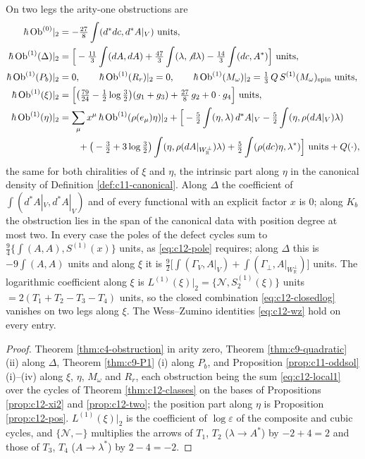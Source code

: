 \begin{theorem}
\label{thm:c12-ob1}
On two legs the arity-one obstructions are
\begin{equation}
\begin{aligned}
\hbar\,\mathrm{Ob}^{(0)}|_2&=-\tfrac{27}8\int(d^*dc,d^*A|_V)\ \text{units},\\
\hbar\,\mathrm{Ob}^{(1)}(\Delta)|_2&=\Big[-\tfrac{11}3\int(dA,dA)+\tfrac{47}3\int(\lambda,{\not d}\lambda)-\tfrac{14}3\int(dc,A^*)\Big]\ \text{units},\\
\hbar\,\mathrm{Ob}^{(1)}(P_b)|_2&=0,\qquad \hbar\,\mathrm{Ob}^{(1)}(R_r)|_2=0,\qquad \hbar\,\mathrm{Ob}^{(1)}(M_\omega)|_2=\tfrac13\,Q\,S^{(1)}(M_\omega)_{\rm spin}\ \text{units},\\
\hbar\,\mathrm{Ob}^{(1)}(\xi)|_2&=\Big[\big(\tfrac{79}{24}-\tfrac12\log\tfrac32\big)(g_1+g_3)+\tfrac{27}8\,g_2+0\cdot g_4\Big]\ \text{units},\\
\hbar\,\mathrm{Ob}^{(1)}(\eta)|_2&=\sum_\mu x^\mu\,\hbar\,\mathrm{Ob}^{(1)}(\rho(e_\mu)\eta)|_2+\Big[-\tfrac52\int(\eta,\lambda)\,d^*A|_V-\tfrac52\int(\eta,\rho(dA|_V)\lambda)\\
&\qquad+\big(-\tfrac32+3\log\tfrac32\big)\int(\eta,\rho(dA|_{W_{\mathbb R}^\perp})\lambda)+\tfrac52\int(\rho(dc)\eta,\lambda^*)\Big]\ \text{units}+Q(\cdot),
\end{aligned}
\label{eq:c12-ob1}
\end{equation}
the same for both chiralities of $\xi$ and $\eta$, the intrinsic part along $\eta$ in the canonical density of Definition \ref{def:c11-canonical}. Along $\Delta$ the coefficient of $\int(d^*A|_V,d^*A|_V)$ and of every functional with an explicit factor $x$ is $0$; along $K_b$ the obstruction lies in the span of the canonical data with position degree at most two. In every case the poles of the defect cycles sum to $\tfrac94\{\int(A,A),S^{(1)}(x)\}$ units, as \eqref{eq:c12-pole} requires; along $\Delta$ this is $-9\int(A,A)$ units and along $\xi$ it is $\tfrac92\big[\int(\Gamma_V,A|_V)+\int(\Gamma_\perp,A|_{W_{\mathbb R}^\perp})\big]$ units. The logarithmic coefficient along $\xi$ is $L^{(1)}(\xi)|_2=\{\mathcal N,S^{(1)}_2(\xi)\}$ units $=2(T_1+T_2-T_3-T_4)$ units, so the closed combination \eqref{eq:c12-closedlog} vanishes on two legs along $\xi$. The Wess--Zumino identities \eqref{eq:c12-wz} hold on every entry.
\end{theorem}

\begin{proof}
Theorem \ref{thm:c4-obstruction} in arity zero, Theorem \ref{thm:c9-quadratic} (ii) along $\Delta$, Theorem \ref{thm:c9-P1} (i) along $P_b$, and Proposition \ref{prop:c11-oddsol} (i)--(iv) along $\xi$, $\eta$, $M_\omega$ and $R_r$, each obstruction being the sum \eqref{eq:c12-local1} over the cycles of Theorem \ref{thm:c12-classes} on the bases of Propositions \ref{prop:c12-xi2} and \ref{prop:c12-two}; the position part along $\eta$ is Proposition \ref{prop:c12-pos}. $L^{(1)}(\xi)|_2$ is the coefficient of $\log\varepsilon$ of the composite and cubic cycles, and $\{\mathcal N,-\}$ multiplies the arrows of $T_1$, $T_2$ ($\lambda\to A^*$) by $-2+4=2$ and those of $T_3$, $T_4$ ($A\to\lambda^*$) by $2-4=-2$.
\end{proof}

